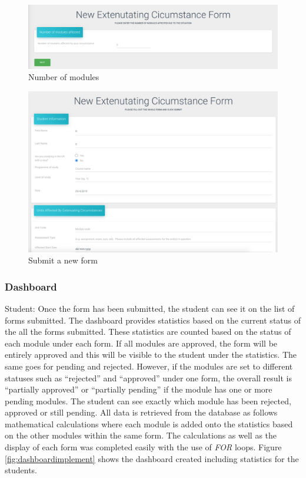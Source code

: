 \documentclass[../main.tex]{subfiles}
\begin{document}
\begin{figure}[H]
        \includegraphics[scale=0.7]
        {images/units.png}
        \caption{\label{fig:units} Number of modules}
      \end{figure}

\begin{figure}[H]
        \includegraphics[scale=0.7]
        {images/newform.png}
        \caption{\label{fig:newform} Submit a new form}
      \end{figure}

\subsubsection{Dashboard} 
Student: Once the form has been submitted, the student can see it on the list of forms submitted. The dashboard provides statistics based on the current status of the all the forms submitted. These statistics are counted based on the status of each module under each form. If all modules are approved, the form will be entirely approved and this will be visible to the student under the statistics. The same goes for pending and rejected. However, if the modules are set to different statuses such as \enquote{rejected} and \enquote{approved} under one form, the overall result is \enquote{partially approved} or \enquote{partially pending} if the module has one or more pending modules. The student can see exactly which module has been rejected, approved or still pending.  All data is retrieved from the database as follows mathematical calculations where each module is added onto the statistics based on the other modules within the same form. The calculations as well as the display of each form was completed easily with the use of \textit{FOR} loops. Figure \ref{fig:dashboardimplement} shows the dashboard created including statistics for the students.\\[4mm] 
\end{document}
